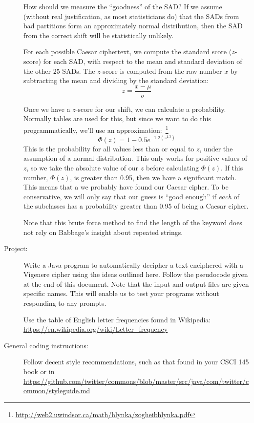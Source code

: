 \documentclass{article}
\begin{document}
\begin{description}
How should we measure the ``goodness'' of the SAD?  If we assume
(without real justification, as most statisticians do) that the SADs
from bad partitions form an approximately normal distribution, then the
SAD from the correct shift will be statistically unlikely.

For each possible Caesar ciphertext, we
compute the standard score ($z$-score) for each SAD, with respect to
the mean and standard deviation of the other 25 SADs.  The $z$-score
is computed from the raw number $x$ by subtracting the mean and
dividing by the standard deviation:
\[
z = \frac{x - \mu}{\sigma}
\]


Once we have a $z$-score for our shift, we can calculate a
probability.  Normally tables are used for this, but since we want to
do this programmatically, we'll use an
approximation:\
\footnote{\url{http://web2.uwindsor.ca/math/hlynka/zogheibhlynka.pdf}}
  \[ \Phi(z) = 1 - 0.5 e^{-1.2(z^{1.3})} \]
This is the probability for all values less than or equal to $z$,
under the assumption of a normal distribution.
This only works for positive values of $z$, so we take the absolute
value of our $z$ before calculating $\Phi(z)$.
If this number, $\Phi(z)$, is greater than 0.95, then we have a
significant match.  This means that a we probably have found our
Caesar cipher.  To be conservative, we will only say that our guess is
``good enough'' if {\em each} of the subclasses has a probability
greater than 0.95 of being a Caesar cipher.

Note that this brute force method to find the length of the keyword
does not rely on Babbage's insight about repeated strings.  
  

\item[Project:]  Write a Java program to automatically decipher a text
  enciphered with a Vigenere cipher using the ideas outlined here.
  Follow the pseudocode given at the end of this document.  Note that
  the input and output files are given specific names.  This will
  enable us to test your programs without responding to any prompts.

  Use the table of English letter frequencies found in
  Wikipedia: {\url{https://en.wikipedia.org/wiki/Letter_frequency}}


  
\item[General coding instructions:]  Follow decent style
  recommendations,
  such as that found in your CSCI 145 book or in
  \url{https://github.com/twitter/commons/blob/master/src/java/com/twitter/common/styleguide.md}


\end{description}
\end{document}
